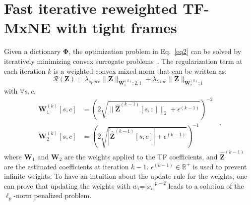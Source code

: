 \section{Fast iterative reweighted TF-MxNE with tight frames}
Given a dictionary $\mathbf{\Phi}$, the optimization problem in Eq.~\eqref{eq2} can be solved by iteratively minimizing convex surrogate problems~\cite{daniel15}. The regularization term at each iteration $k$ is a weighted convex mixed norm that can be written as:
\begin{equation} \label{eq4}
    \mathcal{R}(\mathbf{Z}) = \lambda_{space}\|\mathbf{Z}\|_{\mathbf{W}_1^{(k)};2,1} + \lambda_{time}\|\mathbf{Z}\|_{\mathbf{W}_2^{(k)};1}
\end{equation}
with $\forall s,c$,
\begin{equation*}
\begin{aligned}
    \mathbf{W}_1^{(k)}[s,c] &= \left(2\sqrt{\|\hat{\mathbf{Z}}^{(k-1)}[s,:]\|_2 + \epsilon^{(k-1)}}\right)^{-2} \\
    \mathbf{W}_2^{(k)}[s,c] &= \left(2\sqrt{|\hat{\mathbf{Z}}^{(k-1)}[s,c]| + \epsilon^{(k-1)}}\right)^{-1}
\end{aligned} \enspace ,
\end{equation*}
%
where $\mathbf{W}_1$ and $\mathbf{W}_2$ are the weights applied to the TF coefficients, and $\mathbf{\hat{Z}}^{(k-1)}$ are the estimated coefficients at iteration $k-1$. $\epsilon^{(k-1)} \in \mathbb{R}^+$ is used to prevent infinite weights. To have an intuition about the update rule for the weights, one can prove that updating the weights with $w_i$=$|x_i|^{p-2}$ leads to a solution of the $\ell_p$-norm penalized problem.

